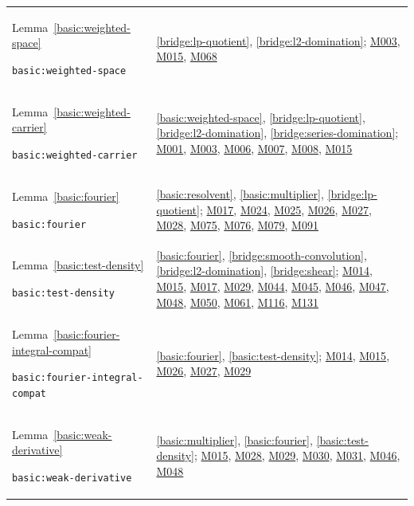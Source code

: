 \documentclass[11pt,a4paper]{article}
\theoremstyle{definition}
\theoremstyle{remark}
\begin{document}
\begin{longtable}{@{}p{}p{}@{}}
Lemma~\ref{basic:weighted-space}\par\nolinkurl{basic:weighted-space} & \ref{bridge:lp-quotient}, \ref{bridge:l2-domination}; \hyperref[base:M003]{M003}, \hyperref[base:M015]{M015}, \hyperref[base:M068]{M068} \\[4pt]
Lemma~\ref{basic:weighted-carrier}\par\nolinkurl{basic:weighted-carrier} & \ref{basic:weighted-space}, \ref{bridge:lp-quotient}, \ref{bridge:l2-domination}, \ref{bridge:series-domination}; \hyperref[base:M001]{M001}, \hyperref[base:M003]{M003}, \hyperref[base:M006]{M006}, \hyperref[base:M007]{M007}, \hyperref[base:M008]{M008}, \hyperref[base:M015]{M015} \\[4pt]
Lemma~\ref{basic:fourier}\par\nolinkurl{basic:fourier} & \ref{basic:resolvent}, \ref{basic:multiplier}, \ref{bridge:lp-quotient}; \hyperref[base:M017]{M017}, \hyperref[base:M024]{M024}, \hyperref[base:M025]{M025}, \hyperref[base:M026]{M026}, \hyperref[base:M027]{M027}, \hyperref[base:M028]{M028}, \hyperref[base:M075]{M075}, \hyperref[base:M076]{M076}, \hyperref[base:M079]{M079}, \hyperref[base:M091]{M091} \\[4pt]
Lemma~\ref{basic:test-density}\par\nolinkurl{basic:test-density} & \ref{basic:fourier}, \ref{bridge:smooth-convolution}, \ref{bridge:l2-domination}, \ref{bridge:shear}; \hyperref[base:M014]{M014}, \hyperref[base:M015]{M015}, \hyperref[base:M017]{M017}, \hyperref[base:M029]{M029}, \hyperref[base:M044]{M044}, \hyperref[base:M045]{M045}, \hyperref[base:M046]{M046}, \hyperref[base:M047]{M047}, \hyperref[base:M048]{M048}, \hyperref[base:M050]{M050}, \hyperref[base:M061]{M061}, \hyperref[base:M116]{M116}, \hyperref[base:M131]{M131} \\[4pt]
Lemma~\ref{basic:fourier-integral-compat}\par\nolinkurl{basic:fourier-integral-compat} & \ref{basic:fourier}, \ref{basic:test-density}; \hyperref[base:M014]{M014}, \hyperref[base:M015]{M015}, \hyperref[base:M026]{M026}, \hyperref[base:M027]{M027}, \hyperref[base:M029]{M029} \\[4pt]
Lemma~\ref{basic:weak-derivative}\par\nolinkurl{basic:weak-derivative} & \ref{basic:multiplier}, \ref{basic:fourier}, \ref{basic:test-density}; \hyperref[base:M015]{M015}, \hyperref[base:M028]{M028}, \hyperref[base:M029]{M029}, \hyperref[base:M030]{M030}, \hyperref[base:M031]{M031}, \hyperref[base:M046]{M046}, \hyperref[base:M048]{M048} \\[4pt]

\end{longtable}
\end{document}

